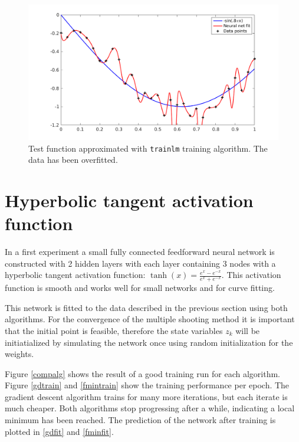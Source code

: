 \begin{figure}
	\centering
         \includegraphics[width=\textwidth]{trainlm}
         \caption{Test function approximated with \texttt{trainlm} training algorithm. The data has been overfitted.}
         \label{trainlm}
\end{figure}

\section{Hyperbolic tangent activation function}
In a first experiment a small fully connected feedforward neural network is constructed with 2 hidden layers with each layer containing 3 nodes with a hyperbolic tangent activation function: $\tanh(x) = \frac{e^x-e^{-x}}{e^x+e^{-x}}$. This activation function is smooth and works well for small networks and for curve fitting. 

This network is fitted to the data described in the previous section using both algorithms. For the convergence of the multiple shooting method it is important that the initial point is feasible, therefore the state variables $z_k$ will be initiatialized by simulating the network once using random initialization for the weights.

Figure \ref{compalg} shows the result of a good training run for each algorithm. Figure \ref{gdtrain} and \ref{fmintrain} show the training performance per epoch. The gradient descent algorithm trains for many more iterations, but each iterate is much cheaper. Both algorithms stop progressing after a while, indicating a local minimum has been reached. The prediction of the network after training is plotted in \ref{gdfit} and \ref{fminfit}.

